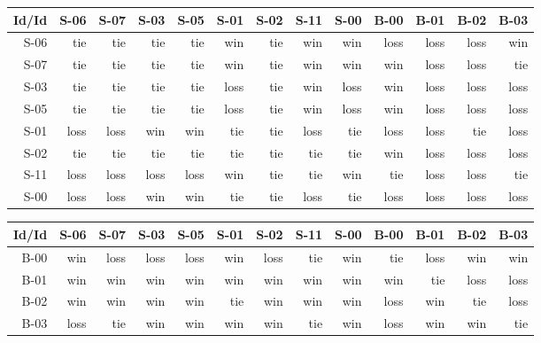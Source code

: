 \begin{tabular}{ | r | r | r | r | r | r | r | r | r | r | r | r | r | }
    \hline
        Id/Id  &   S-06  &   S-07  &   S-03  &   S-05  &   S-01  &   S-02  &   S-11  &   S-00  &   B-00  &   B-01  &   B-02  &   B-03  \\
    \hline
    \hline
         S-06  &    tie  &    tie  &    tie  &    tie  &    win  &    tie  &    win  &    win  &   loss  &   loss  &   loss  &    win  \\
    \hline
         S-07  &    tie  &    tie  &    tie  &    tie  &    win  &    tie  &    win  &    win  &    win  &   loss  &   loss  &    tie  \\
    \hline
         S-03  &    tie  &    tie  &    tie  &    tie  &   loss  &    tie  &    win  &   loss  &    win  &   loss  &   loss  &   loss  \\
    \hline
         S-05  &    tie  &    tie  &    tie  &    tie  &   loss  &    tie  &    win  &   loss  &    win  &   loss  &   loss  &   loss  \\
    \hline
         S-01  &   loss  &   loss  &    win  &    win  &    tie  &    tie  &   loss  &    tie  &   loss  &   loss  &    tie  &   loss  \\
    \hline
         S-02  &    tie  &    tie  &    tie  &    tie  &    tie  &    tie  &    tie  &    tie  &    win  &   loss  &   loss  &   loss  \\
    \hline
         S-11  &   loss  &   loss  &   loss  &   loss  &    win  &    tie  &    tie  &    win  &    tie  &   loss  &   loss  &    tie  \\
    \hline
         S-00  &   loss  &   loss  &    win  &    win  &    tie  &    tie  &   loss  &    tie  &   loss  &   loss  &   loss  &   loss  \\
    \hline
\end{tabular}


\begin{tabular}{ | r | r | r | r | r | r | r | r | r | r | r | r | r | }
    \hline
        Id/Id  &   S-06  &   S-07  &   S-03  &   S-05  &   S-01  &   S-02  &   S-11  &   S-00  &   B-00  &   B-01  &   B-02  &   B-03  \\
    \hline
    \hline
         B-00  &    win  &   loss  &   loss  &   loss  &    win  &   loss  &    tie  &    win  &    tie  &   loss  &    win  &    win  \\
    \hline
         B-01  &    win  &    win  &    win  &    win  &    win  &    win  &    win  &    win  &    win  &    tie  &   loss  &   loss  \\
    \hline
         B-02  &    win  &    win  &    win  &    win  &    tie  &    win  &    win  &    win  &   loss  &    win  &    tie  &   loss  \\
    \hline
         B-03  &   loss  &    tie  &    win  &    win  &    win  &    win  &    tie  &    win  &   loss  &    win  &    win  &    tie  \\
    \hline
\end{tabular}


